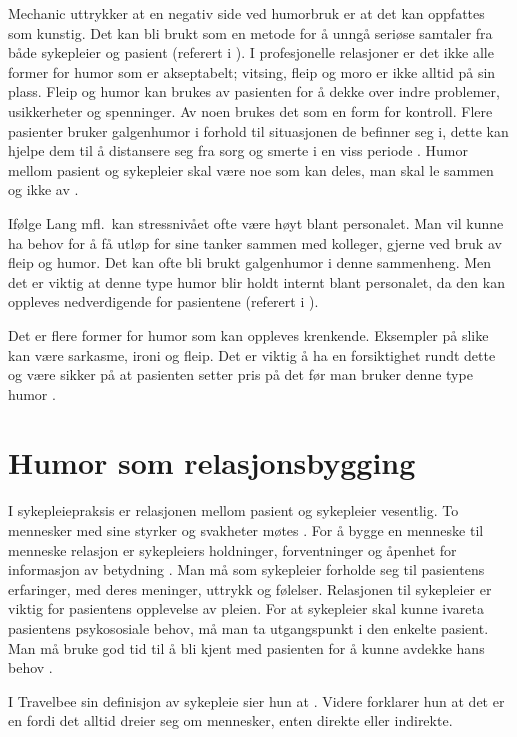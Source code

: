 Mechanic uttrykker at en negativ side ved humorbruk er at det kan
oppfattes som kunstig. Det kan bli brukt som en metode for å unngå seriøse
samtaler fra både sykepleier og pasient (referert i ).
I profesjonelle relasjoner er det ikke alle former for humor som er
akseptabelt; vitsing, fleip og moro er ikke alltid på sin plass. Fleip og humor
kan brukes av pasienten for å dekke over indre problemer, usikkerheter og
spenninger. Av noen brukes det som en form for kontroll. Flere pasienter bruker
galgenhumor i forhold til situasjonen de befinner seg i, dette kan hjelpe dem
til å distansere seg fra sorg og smerte i en viss periode
\cite[s.~56]{bohn2000}. Humor mellom pasient og sykepleier skal være noe som
kan deles, man skal le sammen og ikke av \cite[s.~166]{wist2002}.

Ifølge Lang mfl.~kan stressnivået ofte være høyt blant personalet. Man vil
kunne ha behov for å få utløp for sine tanker sammen med kolleger, gjerne ved
bruk av fleip og humor. Det kan ofte bli brukt galgenhumor i denne sammenheng.
Men det er viktig at denne type humor blir holdt internt blant personalet, da
den kan oppleves nedverdigende for pasientene (referert i
).

Det er flere former for humor som kan oppleves krenkende. Eksempler på slike
kan være sarkasme, ironi og fleip. Det er viktig å ha en forsiktighet rundt
dette og være sikker på at pasienten setter pris på det før man bruker denne
type humor \cite[s.~246]{eide2008}.

\section{Humor som relasjonsbygging}

I sykepleiepraksis er relasjonen mellom pasient og sykepleier vesentlig. To
mennesker med sine styrker og svakheter møtes \cite[s.~889]{eriksen2015}. For å
bygge en menneske til menneske relasjon er sykepleiers holdninger,
forventninger og åpenhet for informasjon av betydning
\cite[s.~89]{brataas2011}. Man må som sykepleier forholde seg til pasientens
erfaringer, med deres meninger, uttrykk og følelser.
Relasjonen til sykepleier er viktig for pasientens opplevelse av pleien. For at
sykepleier skal kunne ivareta pasientens psykososiale behov, må man ta
utgangspunkt i den enkelte pasient.  Man må bruke god tid til å bli kjent med
pasienten for å kunne avdekke hans behov \cite[s.~889--901]{eriksen2015}.

I Travelbee sin definisjon av sykepleie sier hun at
. Videre forklarer
hun at det er en  fordi det alltid dreier
seg om mennesker, enten direkte eller indirekte.

